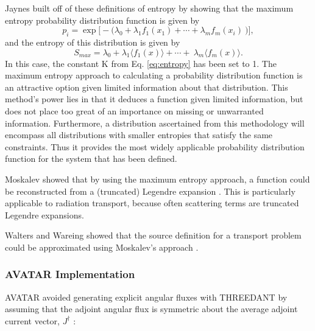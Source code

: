 Jaynes \cite{jaynes_information_1957} built off of these definitions
of entropy by showing that the maximum
entropy probability distribution function is given by
\begin{equation}
  p_i= \exp \big[ - \big( \lambda_0 + \lambda_1f_1(x_1) + \cdots + \lambda_m f_m(x_i) \
    \big) \big] ,
\end{equation}
and the entropy of this distribution is given by
\begin{equation}
  S_{max} = \lambda_0 + \lambda_1 \big\langle f_1 (x) \big\rangle + \cdots + \
  \lambda_m \big\langle f_m(x) \big\rangle .
\end{equation}
In this case, the constant K from Eq. \eqref{eq:entropy} has been set to 1.
The maximum entropy approach to calculating a probability distribution function
is an attractive option given limited information about that
distribution. This method's power lies in that it
deduces a function given limited information, but does not place too great of an
importance on missing or unwarranted information. Furthermore, a distribution
ascertained from this methodology will encompass all distributions with smaller
entropies that satisfy the same constraints. Thus it provides the most widely
applicable probability distribution function for the system that has been
defined.

Moskalev showed that by using the maximum entropy approach, a function could be
reconstructed from a (truncated) Legendre expansion
\cite{moskalev_reconstruction_1993}. This is particularly
applicable to radiation transport, because often scattering terms are truncated
Legendre expansions.

Walters and Wareing \cite{walters_nonlinear_1994, walters_accurate_1996} showed
that the source definition for a transport problem could be approximated using
Moskalev's approach \cite{moskalev_reconstruction_1993}.

\subsubsection{AVATAR Implementation}

AVATAR avoided generating explicit angular fluxes with
THREEDANT by assuming
that the adjoint angular flux is symmetric about the average adjoint current vector,
$J^{\dagger}$ :

